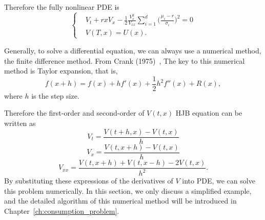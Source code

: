 \documentclass[a4paper]{article}
\theoremstyle{definition}
\numberwithin{equation}{section}
\begin{document}
Therefore the fully nonlinear PDE is
\begin{equation}\label{pde}
\left\{
\begin{aligned}
&V_t+rxV_x-\frac{1}{2}\frac{V^2_x}{V_{xx}}\sum^d_{i=1}\big(\frac{\mu_i-r}{\sigma_i}\big)^2=0\\
&V(T,x)=U(x).
\end{aligned}
\right.
\end{equation}

Generally, to solve a differential equation, we can always use a numerical method, the finite difference method. From Crank (1975)~\cite{fdm}, The key to this numerical method is Taylor expansion, that is,
$$f(x+h)=f(x)+hf'(x)+\frac{1}{2}h^2f''(x)+R(x),$$
where $h$ is the step size.

Therefore the first-order and second-order of $V(t,x)$ HJB equation can be written as
$$V_t=\frac{V(t+h,x)-V(t,x)}{h}$$
$$V_x=\frac{V(t,x+h)-V(t,x)}{h}$$
$$V_{xx}=\frac{V(t,x+h)+V(t,x-h)-2V(t,x)}{h^2}.$$
By substituting these expressions of the derivatives of $V$ into PDE, we can solve this problem numerically. In this section, we only discuss a simplified example, and the detailed algorithm of this numerical method will be introduced in Chapter~\ref{ch:consumption_problem}.
\end{document}
